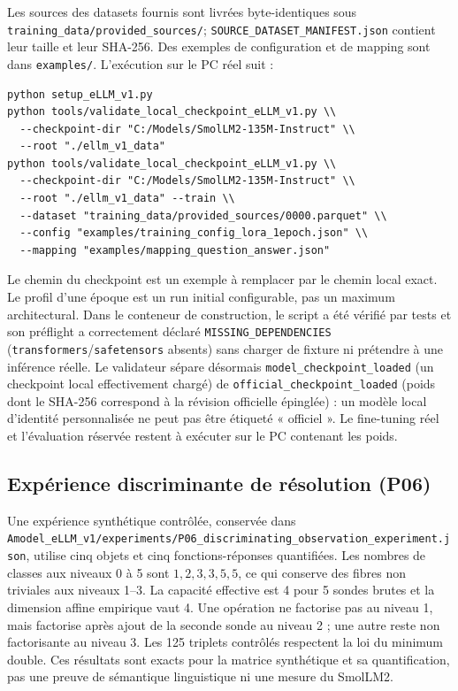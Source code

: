 \documentclass[11pt,a4paper]{article}
\begin{document}
Les sources des datasets fournis sont livrées byte-identiques sous \texttt{training\_data/provided\_sources/}; \texttt{SOURCE\_DATASET\_MANIFEST.json} contient leur taille et leur SHA-256. Des exemples de configuration et de mapping sont dans \texttt{examples/}. L'exécution sur le PC réel suit :
\begin{lstlisting}[basicstyle=\ttfamily\small,breaklines=true]
python setup_eLLM_v1.py
python tools/validate_local_checkpoint_eLLM_v1.py \\
  --checkpoint-dir "C:/Models/SmolLM2-135M-Instruct" \\
  --root "./ellm_v1_data"
python tools/validate_local_checkpoint_eLLM_v1.py \\
  --checkpoint-dir "C:/Models/SmolLM2-135M-Instruct" \\
  --root "./ellm_v1_data" --train \\
  --dataset "training_data/provided_sources/0000.parquet" \\
  --config "examples/training_config_lora_1epoch.json" \\
  --mapping "examples/mapping_question_answer.json"
\end{lstlisting}
Le chemin du checkpoint est un exemple à remplacer par le chemin local exact. Le profil d'une époque est un run initial configurable, pas un maximum architectural. Dans le conteneur de construction, le script a été vérifié par tests et son préflight a correctement déclaré \texttt{MISSING\_DEPENDENCIES} (\texttt{transformers}/\texttt{safetensors} absents) sans charger de fixture ni prétendre à une inférence réelle. Le validateur sépare désormais \texttt{model\_checkpoint\_loaded} (un checkpoint local effectivement chargé) de \texttt{official\_checkpoint\_loaded} (poids dont le SHA-256 correspond à la révision officielle épinglée) : un modèle local d'identité personnalisée ne peut pas être étiqueté « officiel ». Le fine-tuning réel et l'évaluation réservée restent à exécuter sur le PC contenant les poids.

\subsection{Expérience discriminante de résolution (P06)}
Une expérience synthétique contrôlée, conservée dans \texttt{Amodel\_eLLM\_v1/experiments/P06\_discriminating\_observation\_experiment.json}, utilise cinq objets et cinq fonctions-réponses quantifiées. Les nombres de classes aux niveaux 0 à 5 sont \(1,2,3,3,5,5\), ce qui conserve des fibres non triviales aux niveaux 1--3. La capacité effective est 4 pour 5 sondes brutes et la dimension affine empirique vaut 4. Une opération ne factorise pas au niveau 1, mais factorise après ajout de la seconde sonde au niveau 2 ; une autre reste non factorisante au niveau 3. Les 125 triplets contrôlés respectent la loi du minimum double. Ces résultats sont exacts pour la matrice synthétique et sa quantification, pas une preuve de sémantique linguistique ni une mesure du SmolLM2.
\end{document}
